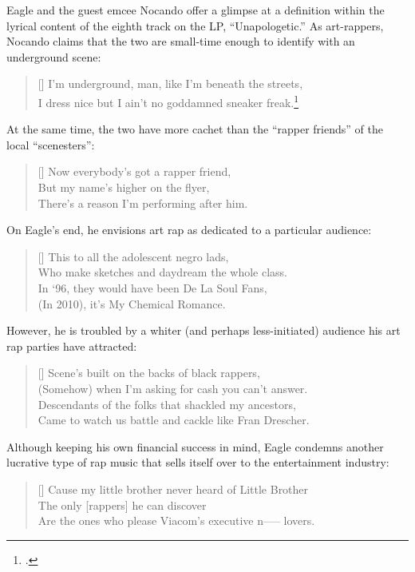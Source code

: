 Eagle and the guest emcee Nocando offer a glimpse at a definition within the lyrical content of
the eighth track on the LP, ``Unapologetic.'' As art-rappers, Nocando claims that the two are 
small-time enough to identify with an underground scene:
\settowidth{\versewidth}{I dress nice but I ain't no goddamned sneaker freak.}
    \begin{verse}[\versewidth]
        I'm underground, man, like I'm beneath the streets, \\ 
        I dress nice but I ain't no goddamned sneaker freak.\footnote{
            \cite{openmikeeagle2010}.}
    \end{verse}
At the same time, the two have more cachet than the ``rapper friends''  of the local  
``scenesters'':
\settowidth{\versewidth}{There's a reason I'm performing after him.}
    \begin{verse}[\versewidth]
        Now everybody's got a rapper friend, \\ 
        But my name's higher on the flyer,\\
        There's a reason I'm performing after him.
    \end{verse}
On Eagle's end, he envisions art rap as dedicated to a particular audience:
\settowidth{\versewidth}{Who make sketches and daydream the whole class.}
    \begin{verse}[\versewidth]
        This to all the adolescent negro lads, \\
        Who make sketches and daydream the whole class. \\
        In `96, they would have been De La Soul Fans, \\
        (In 2010), it's My Chemical Romance.
    \end{verse}
However, he is troubled by a whiter (and perhaps less-initiated) audience his art rap 
parties have attracted:
\settowidth{\versewidth}{Came to watch us battle and cackle like Fran Drescher.}
    \begin{verse}[\versewidth]
        Scene's built on the backs of black rappers, \\
        (Somehow) when I'm asking for cash you can't answer. \\ 
        Descendants of the folks that shackled my ancestors, \\ 
        Came to watch us battle and cackle like Fran Drescher.
    \end{verse}
Although keeping his own financial success in mind, Eagle condemns another lucrative type of rap
music that sells itself over to the entertainment industry:
\settowidth{\versewidth}{Cause my little brother never heard of Little Brother \textellipsis}
    \begin{verse}[\versewidth]
        Cause my little brother never heard of Little Brother \textellipsis \\ 
        The only [rappers] he can discover \\
        Are the ones who please Viacom's executive n----- lovers.
    \end{verse}

